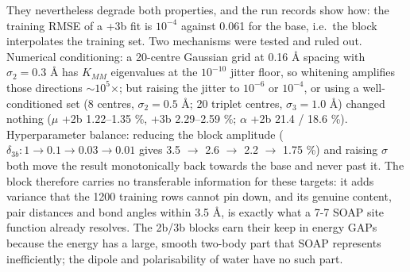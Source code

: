 \documentclass[
  10pt,
]{article}
\begin{document}
They nevertheless degrade both properties, and the run records show how: the training RMSE of a +3b
fit is \(10^{-4}\) against 0.061 for the base, i.e.~the block interpolates the training set. Two
mechanisms were tested and ruled out. Numerical conditioning: a 20-centre Gaussian grid at 0.16
\AA{} spacing with \(\sigma_2=0.3\) \AA{} has \(K_{MM}\) eigenvalues at the \(10^{-10}\) jitter
floor, so whitening amplifies those directions \(\sim10^{5}\)\(\times\); but raising the jitter to
\(10^{-6}\) or \(10^{-4}\), or using a well-conditioned set (8 centres, \(\sigma_2=0.5\) \AA{}; 20
triplet centres, \(\sigma_3=1.0\) \AA{}) changed nothing (\(\mu\) +2b 1.22--1.35 \%, +3b 2.29--2.59
\%; \(\alpha\) +2b 21.4 / 18.6 \%). Hyperparameter balance: reducing the block amplitude
(\(\delta_{3b}: 1\to0.1\to0.03\to0.01\) gives 3.5 \(\rightarrow\) 2.6 \(\rightarrow\) 2.2
\(\rightarrow\) 1.75 \%) and raising \(\sigma\) both move the result monotonically back towards the
base and never past it. The block therefore carries no transferable information for these targets:
it adds variance that the 1200 training rows cannot pin down, and its genuine content, pair
distances and bond angles within 3.5 \AA{}, is exactly what a 7-7 SOAP site function already
resolves. The 2b/3b blocks earn their keep in energy GAPs because the energy has a large, smooth
two-body part that SOAP represents inefficiently; the dipole and polarisability of water have no
such part.
\end{document}
